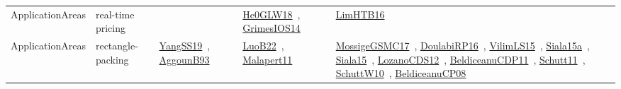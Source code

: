{\begin{longtable}{lp{3cm}>{\raggedright\arraybackslash}p{6cm}>{\raggedright\arraybackslash}p{6cm}>{\raggedright\arraybackslash}p{8cm}}
\index{real-time pricing}\index{ApplicationAreas!real-time pricing}ApplicationAreas & real-time pricing &  & \href{../works/He0GLW18.pdf}{He0GLW18}~\cite{He0GLW18}, \href{../works/GrimesIOS14.pdf}{GrimesIOS14}~\cite{GrimesIOS14} & \href{../works/LimHTB16.pdf}{LimHTB16}~\cite{LimHTB16}\\
\index{rectangle-packing}\index{ApplicationAreas!rectangle-packing}ApplicationAreas & rectangle-packing & \href{../works/YangSS19.pdf}{YangSS19}~\cite{YangSS19}, \href{../works/AggounB93.pdf}{AggounB93}~\cite{AggounB93} & \href{../works/LuoB22.pdf}{LuoB22}~\cite{LuoB22}, \href{../works/Malapert11.pdf}{Malapert11}~\cite{Malapert11} & \href{../works/MossigeGSMC17.pdf}{MossigeGSMC17}~\cite{MossigeGSMC17}, \href{../works/DoulabiRP16.pdf}{DoulabiRP16}~\cite{DoulabiRP16}, \href{../works/VilimLS15.pdf}{VilimLS15}~\cite{VilimLS15}, \href{../works/Siala15a.pdf}{Siala15a}~\cite{Siala15a}, \href{../works/Siala15.pdf}{Siala15}~\cite{Siala15}, \href{../works/LozanoCDS12.pdf}{LozanoCDS12}~\cite{LozanoCDS12}, \href{../works/BeldiceanuCDP11.pdf}{BeldiceanuCDP11}~\cite{BeldiceanuCDP11}, \href{../works/Schutt11.pdf}{Schutt11}~\cite{Schutt11}, \href{../works/SchuttW10.pdf}{SchuttW10}~\cite{SchuttW10}, \href{../works/BeldiceanuCP08.pdf}{BeldiceanuCP08}~\cite{BeldiceanuCP08}\\

\end{longtable}}
